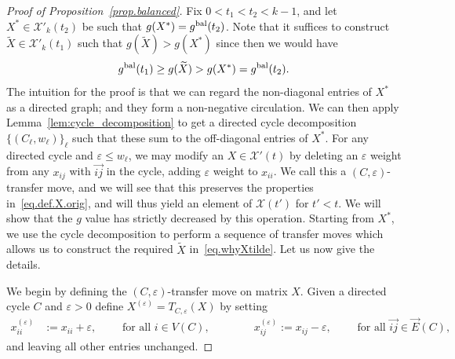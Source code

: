 \documentclass[a4paper,UKenglish,cleveref, autoref, thm-restate,numberwithinsect]{lipics-v2021}
\newcommand{\cX}{\mathcal{X}}
\newcommand{\eps}{\varepsilon}
\begin{document}
\begin{proof}[Proof of Proposition~\ref{prop.balanced}]
Fix $0<t_1 < t_2 < k-1$, and let $X^*\in \cX'_k(t_2)$ be such that $g(X^*)=g^{\rm bal}(t_2)$. Note that it suffices to construct $\widetilde{X}\in \cX'_k(t_1)$ such that $g(\widetilde{X})>g(X^*)$ since then we would have
\begin{equation}\label{eq.whyXtilde} g^{\rm bal}(t_1) \geq g(\widetilde{X})>g(X^*) = g^{\rm bal}(t_2).\end{equation}
%
%
The intuition for the proof is that we can regard the non-diagonal entries of $X^*$ as a directed graph; and they form a non-negative circulation. We can then apply Lemma~\ref{lem:cycle_decomposition} to get a directed cycle decomposition $\{(C_\ell,w_\ell)\}_\ell$ such that these sum to the off-diagonal entries of $X^*$. For any directed cycle and $\eps \leq w_\ell$, we may modify an $X\in \cX'(t)$ by deleting an $\eps$ weight from any $x_{ij}$ with $\vec{ij}$ in the cycle, adding $\eps$ weight to $x_{ii}$. We call this a $(C, \eps)$-transfer move, and we will see that this preserves the properties in~\eqref{eq.def.X.orig}, and will thus yield an element of $\cX(t')$ for $t'<t$. We will show that the $g$ value has strictly decreased by this operation. Starting from $X^*$, we use the cycle decomposition to perform a sequence of transfer moves which allows us to construct the required $\widetilde{X}$ in~\eqref{eq.whyXtilde}. Let us now give the details.


We begin by defining the $(C,\eps)$-transfer move on matrix $X$. Given a directed cycle $C$ and $\eps>0$ define $X^{(\eps)}=T_{C,\eps}(X)$ by setting 
\begin{align*}
x^{(\varepsilon)}_{ii} &:= x_{ii}+\varepsilon, \qquad \text{ for all }i\in V(C),\qquad \qquad x^{(\varepsilon)}_{ij} := x_{ij}-\varepsilon, \qquad \text{ for all }\vec{ij}\in \vec{E}(C),
\end{align*}
and leaving all other entries unchanged.


\end{proof}
\end{document}
